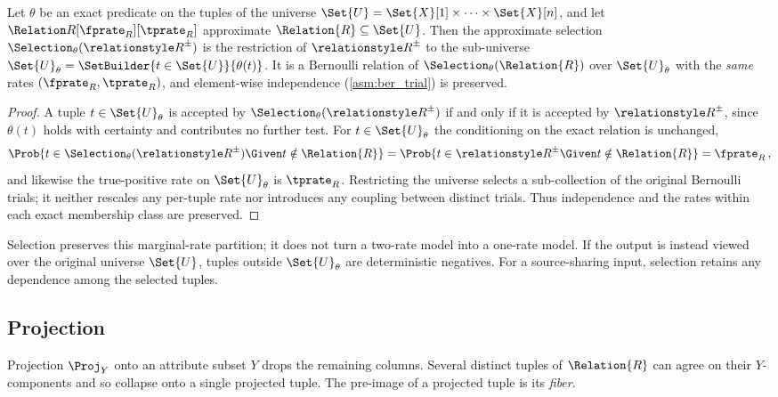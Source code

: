 \documentclass[ ../main.tex]{subfiles}
\begin{document}
\begin{theorem}
\label{thm:select}
Let $\theta$ be an exact predicate on the tuples of the universe
$\Set{U} = \Set{X}[1] \times \cdots \times \Set{X}[n]$, and let
$\ARelation{R}[\fprate_R][\tprate_R]$ approximate $\Relation{R} \subseteq \Set{U}$.
Then the approximate selection $\Selection_\theta(\ARelation{R})$ is the
restriction of $\ARelation{R}$ to the sub-universe
$\Set{U}_\theta = \SetBuilder{t \in \Set{U}}{\theta(t)}$. It is a Bernoulli
relation of $\Selection_\theta(\Relation{R})$ over $\Set{U}_\theta$ with the
\emph{same} rates $(\fprate_R, \tprate_R)$, and element-wise independence
(\cref{asm:ber_trial}) is preserved.
\end{theorem}
\begin{proof}
A tuple $t \in \Set{U}_\theta$ is accepted by $\Selection_\theta(\ARelation{R})$
if and only if it is accepted by $\ARelation{R}$, since $\theta(t)$ holds with
certainty and contributes no further test. For $t \in \Set{U}_\theta$ the
conditioning on the exact relation is unchanged,
\begin{equation}
    \Prob{t \in \Selection_\theta(\ARelation{R}) \Given t \notin \Relation{R}}
    = \Prob{t \in \ARelation{R} \Given t \notin \Relation{R}} = \fprate_R\,,
\end{equation}
and likewise the true-positive rate on $\Set{U}_\theta$ is $\tprate_R$.
Restricting the universe selects a sub-collection of the original Bernoulli
trials; it neither rescales any per-tuple rate nor introduces any coupling
between distinct trials. Thus independence and the rates within each exact
membership class are preserved.
\end{proof}

Selection preserves this marginal-rate partition; it does not turn a two-rate
model into a one-rate model. If the output is instead viewed over the original
universe $\Set{U}$, tuples outside $\Set{U}_\theta$ are deterministic negatives.
For a source-sharing input, selection retains any dependence among the selected
tuples.

\subsection{Projection}
\label{sec:project}
Projection $\Proj_Y$ onto an attribute subset $Y$ drops the remaining columns.
Several distinct tuples of $\Relation{R}$ can agree on their $Y$-components and so
collapse onto a single projected tuple. The pre-image of a projected tuple is its
\emph{fiber}.
\end{document}
